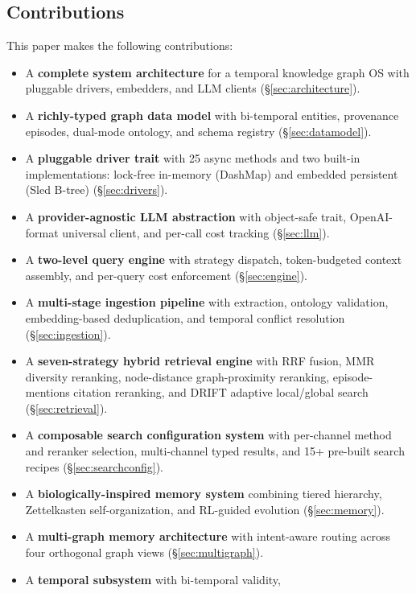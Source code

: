 \documentclass[11pt,a4paper,twocolumn]{article}
\begin{document}
\subsection{Contributions}

This paper makes the following contributions:

\begin{itemize}[leftmargin=*]
  \item A \textbf{complete system architecture} for a temporal
    knowledge graph OS with pluggable drivers, embedders, and LLM
    clients (\S\ref{sec:architecture}).
  \item A \textbf{richly-typed graph data model} with bi-temporal
    entities, provenance episodes, dual-mode ontology, and schema
    registry (\S\ref{sec:datamodel}).
  \item A \textbf{pluggable driver trait} with 25 async methods and
    two built-in implementations: lock-free in-memory (DashMap) and
    embedded persistent (Sled B-tree) (\S\ref{sec:drivers}).
  \item A \textbf{provider-agnostic LLM abstraction} with object-safe
    trait, OpenAI-format universal client, and per-call cost tracking
    (\S\ref{sec:llm}).
  \item A \textbf{two-level query engine} with strategy dispatch,
    token-budgeted context assembly, and per-query cost enforcement
    (\S\ref{sec:engine}).
  \item A \textbf{multi-stage ingestion pipeline} with extraction,
    ontology validation, embedding-based deduplication, and temporal
    conflict resolution (\S\ref{sec:ingestion}).
  \item A \textbf{seven-strategy hybrid retrieval engine} with RRF fusion,
    MMR diversity reranking, node-distance graph-proximity reranking,
    episode-mentions citation reranking, and DRIFT adaptive local/global
    search (\S\ref{sec:retrieval}).
  \item A \textbf{composable search configuration system} with per-channel
    method and reranker selection, multi-channel typed results, and 15+
    pre-built search recipes (\S\ref{sec:searchconfig}).
  \item A \textbf{biologically-inspired memory system} combining tiered
    hierarchy, Zettelkasten self-organization, and RL-guided evolution
    (\S\ref{sec:memory}).
  \item A \textbf{multi-graph memory architecture} with intent-aware
    routing across four orthogonal graph views (\S\ref{sec:multigraph}).
  \item A \textbf{temporal subsystem} with bi-temporal validity,

\end{itemize}
\end{document}
